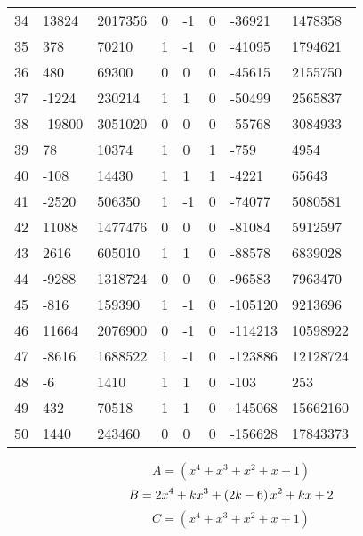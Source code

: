 \documentclass{amsart}
\begin{document}
\begin{longtable}{|l|l|l|lllll|}
34&13824&2017356&0&-1&0&-36921&1478358\\
35&378&70210&1&-1&0&-41095&1794621\\
36&480&69300&0&0&0&-45615&2155750\\
37&-1224&230214&1&1&0&-50499&2565837\\
38&-19800&3051020&0&0&0&-55768&3084933\\
39&78&10374&1&0&1&-759&4954\\
40&-108&14430&1&1&1&-4221&65643\\
41&-2520&506350&1&-1&0&-74077&5080581\\
42&11088&1477476&0&0&0&-81084&5912597\\
43&2616&605010&1&1&0&-88578&6839028\\
44&-9288&1318724&0&0&0&-96583&7963470\\
45&-816&159390&1&-1&0&-105120&9213696\\
46&11664&2076900&0&-1&0&-114213&10598922\\
47&-8616&1688522&1&-1&0&-123886&12128724\\
48&-6&1410&1&1&0&-103&253\\
49&432&70518&1&1&0&-145068&15662160\\
50&1440&243460&0&0&0&-156628&17843373\\
\hline
\end{longtable}
$$A=(x^4
 + x^3
 + x^2
 + x
 + 1)$$
$$B=2\*x^4
 + k\*x^3
 + \left(2\*k
 - 6\right) \*x^2
 + k\*x
 + 2$$
$$C=(x^4
 + x^3
 + x^2
 + x
 + 1)$$
\end{document}
